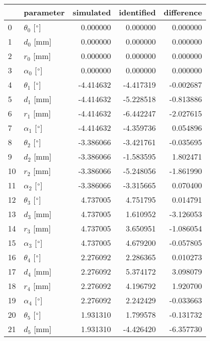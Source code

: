 \documentclass{standalone}%
\begin{document}
%
\normalsize%
\begin{tabular}{llrrr}
\toprule
{} &                 parameter & simulated & identified & difference \\
\midrule
0  &  $\theta_{0}$ [$\degree$] &  0.000000 &   0.000000 &   0.000000 \\
1  &              $d_{0}$ [mm] &  0.000000 &   0.000000 &   0.000000 \\
2  &              $r_{0}$ [mm] &  0.000000 &   0.000000 &   0.000000 \\
3  &  $\alpha_{0}$ [$\degree$] &  0.000000 &   0.000000 &   0.000000 \\
4  &  $\theta_{1}$ [$\degree$] & -4.414632 &  -4.417319 &  -0.002687 \\
5  &              $d_{1}$ [mm] & -4.414632 &  -5.228518 &  -0.813886 \\
6  &              $r_{1}$ [mm] & -4.414632 &  -6.442247 &  -2.027615 \\
7  &  $\alpha_{1}$ [$\degree$] & -4.414632 &  -4.359736 &   0.054896 \\
8  &  $\theta_{2}$ [$\degree$] & -3.386066 &  -3.421761 &  -0.035695 \\
9  &              $d_{2}$ [mm] & -3.386066 &  -1.583595 &   1.802471 \\
10 &              $r_{2}$ [mm] & -3.386066 &  -5.248056 &  -1.861990 \\
11 &  $\alpha_{2}$ [$\degree$] & -3.386066 &  -3.315665 &   0.070400 \\
12 &  $\theta_{3}$ [$\degree$] &  4.737005 &   4.751795 &   0.014791 \\
13 &              $d_{3}$ [mm] &  4.737005 &   1.610952 &  -3.126053 \\
14 &              $r_{3}$ [mm] &  4.737005 &   3.650951 &  -1.086054 \\
15 &  $\alpha_{3}$ [$\degree$] &  4.737005 &   4.679200 &  -0.057805 \\
16 &  $\theta_{4}$ [$\degree$] &  2.276092 &   2.286365 &   0.010273 \\
17 &              $d_{4}$ [mm] &  2.276092 &   5.374172 &   3.098079 \\
18 &              $r_{4}$ [mm] &  2.276092 &   4.196792 &   1.920700 \\
19 &  $\alpha_{4}$ [$\degree$] &  2.276092 &   2.242429 &  -0.033663 \\
20 &  $\theta_{5}$ [$\degree$] &  1.931310 &   1.799578 &  -0.131732 \\
21 &              $d_{5}$ [mm] &  1.931310 &  -4.426420 &  -6.357730 \\

\end{tabular}
\end{document}
